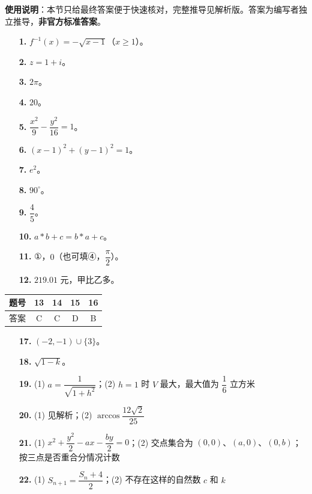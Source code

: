
\begin{gknotice}
\textbf{使用说明}：本节只给最终答案便于快速核对，完整推导见解析版。答案为编写者独立推导，\textbf{非官方标准答案}。
\end{gknotice}

\begin{itemize}[leftmargin=2.6em]
  \item[\textbf{1.}] $f^{-1}(x)=-\sqrt{x-1}$（$x\ge1$）。
  \item[\textbf{2.}] $z=1+i$。
  \item[\textbf{3.}] $2\pi$。
  \item[\textbf{4.}] $20$。
  \item[\textbf{5.}] $\dfrac{x^2}{9}-\dfrac{y^2}{16}=1$。
  \item[\textbf{6.}] $(x-1)^2+(y-1)^2=1$。
  \item[\textbf{7.}] $e^2$。
  \item[\textbf{8.}] $90^\circ$。
  \item[\textbf{9.}] $\dfrac45$。
  \item[\textbf{10.}] $a\ast b+c=b\ast a+c$。
  \item[\textbf{11.}] ①，$0$（也可填④，$\dfrac\pi2$）。
  \item[\textbf{12.}] $219.01$ 元，甲比乙多。
\end{itemize}

\begin{center}\begin{tabular}{ccccc}
\toprule
题号 & 13 & 14 & 15 & 16 \\
\midrule
答案 & C & C & D & B \\
\bottomrule
\end{tabular}\end{center}

\begin{itemize}[leftmargin=2.6em]
  \item[\textbf{17.}] $\left(-2,-1\right)\cup\{3\}$。
  \item[\textbf{18.}] $\sqrt{1-k}$。
  \item[\textbf{19.}] (1) $a=\dfrac1{\sqrt{1+h^2}}$；(2) $h=1$ 时 $V$ 最大，最大值为 $\dfrac16$ 立方米
  \item[\textbf{20.}] (1) 见解析；(2) $\arccos\dfrac{12\sqrt2}{25}$
  \item[\textbf{21.}] (1) $x^2+\dfrac{y^2}{2}-ax-\dfrac{by}{2}=0$；(2) 交点集合为 $(0,0)$、$(a,0)$、$(0,b)$；按三点是否重合分情况计数
  \item[\textbf{22.}] (1) $S_{n+1}=\dfrac{S_n+4}{2}$；(2) 不存在这样的自然数 $c$ 和 $k$
\end{itemize}
